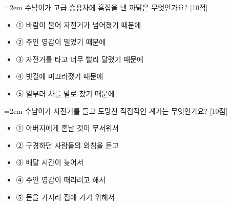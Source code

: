 \documentclass[12pt,a4paper]{article}
\newcommand{\qnum}[1]{%
  \tikz[baseline=(num.base)]{%
    \node[circle, fill=numCircle, text=white, inner sep=0pt,
          minimum size=18pt, font=\small\bfseries] (num) {#1};%
  }%
}
\newcommand{\pts}[1]{%
  \hfill\textcolor{ptsBadge}{[#1점]}%
}
\begin{document}
\vspace{3mm}
\begin{minipage}{\columnwidth}
{\hangindent=2em
\qnum{1}\enspace 수남이가 고급 승용차에 흠집을 낸 까닭은 무엇인가요? \pts{10}
\par}

\vspace{3mm}
\begin{itemize}[leftmargin=2.5em, labelsep=0.3em, label={}, itemsep=4pt, parsep=1pt, topsep=0pt]
  \item ① 바람이 불어 자전거가 넘어졌기 때문에
  \item ② 주인 영감이 밀었기 때문에
  \item ③ 자전거를 타고 너무 빨리 달렸기 때문에
  \item ④ 빗길에 미끄러졌기 때문에
  \item ⑤ 일부러 차를 발로 찼기 때문에
\end{itemize}
\end{minipage}
\vspace{4mm}

\vspace{4mm}
\begin{minipage}{\columnwidth}
{\hangindent=2em
\qnum{2}\enspace 수남이가 자전거를 들고 도망친 직접적인 계기는 무엇인가요? \pts{10}
\par}

\vspace{3mm}
\begin{itemize}[leftmargin=2.5em, labelsep=0.3em, label={}, itemsep=4pt, parsep=1pt, topsep=0pt]
  \item ① 아버지에게 혼날 것이 무서워서
  \item ② 구경하던 사람들의 외침을 듣고
  \item ③ 배달 시간이 늦어서
  \item ④ 주인 영감이 때리려고 해서
  \item ⑤ 돈을 가지러 집에 가기 위해서
\end{itemize}
\end{minipage}
\vspace{4mm}
\end{document}

